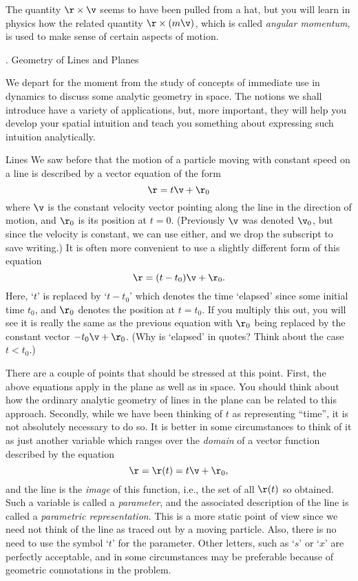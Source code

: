 	The quantity $\r\times \v$ seems to have been pulled from
a hat, but you will learn in physics how the related quantity
$\r\times(m\v)$, which is called {\it angular momentum\/}, is used
%
to make sense of certain aspects of motion. 

\bigskip



\bigskip
{}
\head \sn. Geometry of Lines and Planes \endhead

We depart for the moment from the study of concepts of immediate use
in dynamics to discuss some analytic geometry in space.   The notions
we shall introduce have a variety of applications, but, more important,
they will help you develop your spatial intuition and teach you something
about expressing such intuition analytically.

\subhead Lines \endsubhead
We saw before that the motion of a particle moving with constant speed
on a line is described by a vector equation of the form
$$
\r = t\v + \r_0
$$
%
%
where $\v$ is the constant velocity vector pointing along the line
in the direction of motion, and $\r_0$ is its position at $t = 0$.
(Previously $\v$ was denoted $\v_0$, but since the velocity is constant,
we can use either, and we drop the subscript to save writing.)
It is often more convenient to use a slightly different form
of this equation
$$
  \r = (t - t_0)\v + \r_0.
$$
Here, `$t$' is replaced by `$t - t_0$' which denotes the time
`elapsed' since some initial time $t_0$, and $\r_0$ denotes the
position at $t = t_0$.   If you multiply this out, you will see
it is really the same as the previous equation with $\r_0$
being replaced by the constant vector $-t_0\v + \r_0$.  (Why is
`elapsed' in quotes?  Think about the case $t < t_0$.) 

There are a couple of points that should be stressed at this point.
First, the above equations apply in the plane as well as in space.
You should think about how the ordinary analytic geometry of lines
in the plane can be related to this approach.
Secondly, while we have been thinking of $t$ as representing ``time'',
it is not absolutely necessary to do so.  It is better in some circumstances
to think of it as just another variable which ranges over the {\it domain\/}
of a vector function described by the equation
$$
   \r = \r(t) = t\v + \r_0,
$$
and the line is the {\it image\/} of this function, i.e., the set of
all $\r(t)$ so obtained.   Such a variable is called a {\it parameter\/},
%
and the associated description of the line is called a {\it parametric
representation}.   This is a more static point of view since we need not
think of the line as traced out by a moving particle.  Also, there is no
need to use the symbol `$t$' for the parameter.  Other letters, such as
`$s$' or `$x$' are perfectly acceptable, and in some circumstances may
be preferable because of geometric connotations in the problem. 

